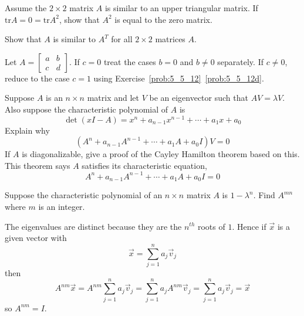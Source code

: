 \documentclass{ximera}
\begin{document}
\begin{problem}\label{prob:2x2_special_nilpotent}
Assume the $2 \times 2$ matrix $A$ is similar to an upper triangular matrix. If $\mbox{tr} A = 0 = \mbox{tr} A^{2}$, show that $A^{2}$ is equal to the zero matrix.
\end{problem}

\begin{problem}\label{prob:2x2_similar_transpose}
Show that $A$ is similar to $A^{T}$ for all $2 \times 2$ matrices $A$. 
\begin{hint}
Let $A =\begin{bmatrix}
a & b \\
c & d
\end{bmatrix}$. If $c = 0$ treat the cases $b = 0$ and $b \neq 0$ separately. If $c \neq 0$, reduce to the case $c = 1$ using Exercise~\ref{prob:5_5_12}~\ref{prob:5_5_12d}.
\end{hint}
\end{problem}

\begin{problem}\label{prb:8.26} Suppose $A$ is an $n\times n$ matrix and let $V$ be an
eigenvector such that $AV=\lambda V$. Also suppose the
characteristic polynomial of $A$ is
\begin{equation*}
\det \left( x I-A\right) =x ^{n}+a_{n-1} x ^{n-1}+\cdots
+a_{1}x +a_{0}
\end{equation*}
Explain why
\begin{equation*}
\left( A^{n}+a_{n-1}A^{n-1}+\cdots +a_{1}A+a_{0}I\right) V=0
\end{equation*}
If $A$ is diagonalizable, give a proof of the Cayley Hamilton
theorem based on this. This theorem says $A$ satisfies its
characteristic equation,
\begin{equation*}
A^{n}+a_{n-1}A^{n-1}+\cdots +a_{1}A+a_{0}I=0
\end{equation*}
\end{problem}

\begin{problem}\label{prb:8.27} Suppose the characteristic polynomial of an $n\times n$ matrix $A$ is
$1-\lambda^{n}$. Find $A^{mn}$ where $m$ is an integer.
\begin{hint}
The eigenvalues are distinct because
they are the $n^{th}$ roots of $1$. Hence if $\vec{x}$ is a given vector with
\[
\vec{x}=\sum_{j=1}^{n}a_{j}\vec{v}_{j}
\]
then
\[
A^{nm}\vec{x}=A^{nm}\sum_{j=1}^{n}a_{j}\vec{v}_{j}=
\sum_{j=1}^{n}a_{j}A^{nm}\vec{v}_{j}=\sum_{j=1}^{n}a_{j}\vec{v}_{j}=\vec{x}
\]
so $A^{nm}=I$.
\end{hint}
\end{problem}
\end{document}
